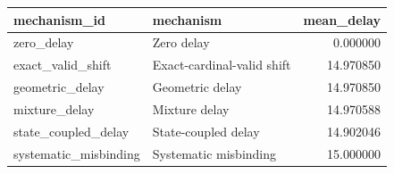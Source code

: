 \begin{tabular}{llr}
\toprule
mechanism\_id & mechanism & mean\_delay \\
\midrule
zero\_delay & Zero delay & 0.000000 \\
exact\_valid\_shift & Exact-cardinal-valid shift & 14.970850 \\
geometric\_delay & Geometric delay & 14.970850 \\
mixture\_delay & Mixture delay & 14.970588 \\
state\_coupled\_delay & State-coupled delay & 14.902046 \\
systematic\_misbinding & Systematic misbinding & 15.000000 \\
\bottomrule
\end{tabular}
